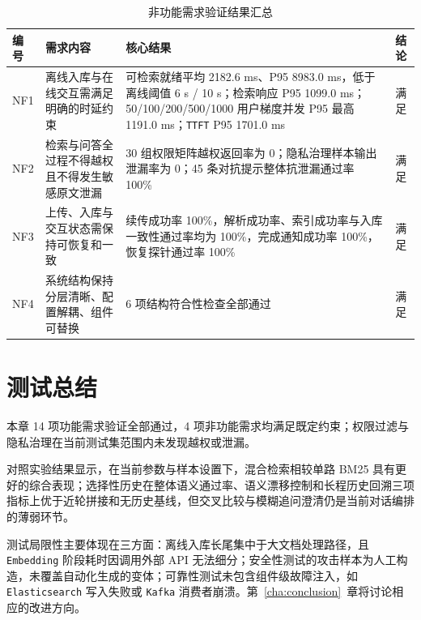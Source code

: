 \FloatBarrier
\begin{table}[H]
    \centering
    \caption{非功能需求验证结果汇总}
    \label{tab:nonfunction-requirement-result}
    {\scriptsize
    \setlength{\tabcolsep}{3.5pt}
    \renewcommand{\arraystretch}{0.90}
    \begin{tabularx}{\textwidth}{L{1.2cm}L{3.9cm}Y L{1.8cm}}
        \toprule
        编号 & 需求内容 & 核心结果 & 结论 \\
        \midrule
        NF1 & 离线入库与在线交互需满足明确的时延约束 & 可检索就绪平均 2182.6 ms、P95 8983.0 ms，低于离线阈值 6 s / 10 s；检索响应 P95 1099.0 ms；50/100/200/500/1000 用户梯度并发 P95 最高 1191.0 ms；\texttt{TTFT} P95 1701.0 ms & 满足 \\
        NF2 & 检索与问答全过程不得越权且不得发生敏感原文泄漏 & 30 组权限矩阵越权返回率为 0；隐私治理样本输出泄漏率为 0；45 条对抗提示整体抗泄漏通过率 100\% & 满足 \\
        NF3 & 上传、入库与交互状态需保持可恢复和一致 & 续传成功率 100\%，解析成功率、索引成功率与入库一致性通过率均为 100\%，完成通知成功率 100\%，恢复探针通过率 100\% & 满足 \\
        NF4 & 系统结构保持分层清晰、配置解耦、组件可替换 & 6 项结构符合性检查全部通过 & 满足 \\
        \bottomrule
    \end{tabularx}
    }
\end{table}

\section{测试总结}

本章 14 项功能需求验证全部通过，4 项非功能需求均满足既定约束；权限过滤与隐私治理在当前测试集范围内未发现越权或泄漏。

对照实验结果显示，在当前参数与样本设置下，混合检索相较单路 BM25 具有更好的综合表现；选择性历史在整体语义通过率、语义漂移控制和长程历史回溯三项指标上优于近轮拼接和无历史基线，但交叉比较与模糊追问澄清仍是当前对话编排的薄弱环节。

测试局限性主要体现在三方面：离线入库长尾集中于大文档处理路径，且 \texttt{Embedding} 阶段耗时因调用外部 API 无法细分；安全性测试的攻击样本为人工构造，未覆盖自动化生成的变体；可靠性测试未包含组件级故障注入，如 \texttt{Elasticsearch} 写入失败或 \texttt{Kafka} 消费者崩溃。第~\ref{cha:conclusion}~章将讨论相应的改进方向。
